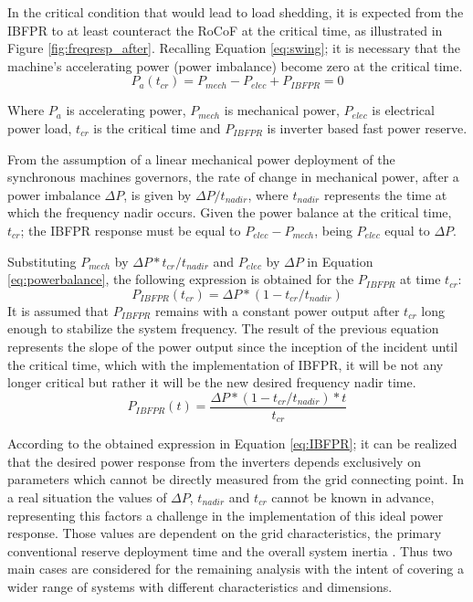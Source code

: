 In the critical condition that would lead to load shedding, it is expected from the IBFPR to at least counteract the RoCoF at the critical time, as illustrated in Figure \ref{fig:freqresp_after}.
Recalling Equation \eqref{eq:swing}; it is necessary that the machine’s accelerating power (power imbalance) become zero at the critical time.
\begin{equation}
	\label{eq:powerbalance}
	P_a (t_{cr} )=P_{mech}-P_{elec}+P_{IBFPR}=0
\end{equation}

Where $ P_a $ is accelerating power, $ P_{mech} $ is mechanical power, $ P_{elec} $ is electrical power load, $ t_{cr} $ is the critical time and $ P_{IBFPR} $ is inverter based fast power reserve.

From the assumption of a linear mechanical power deployment of the synchronous machines governors, the rate of change in mechanical power, after a power imbalance $ \Delta P $, is given by $ \Delta P/t_{nadir} $, where $ t_{nadir} $ represents the time at which the frequency nadir occurs. Given the power balance at the critical time, $ t_{cr} $; the IBFPR response must be equal to $ P_{elec}-P_{mech} $, being $ P_{elec} $ equal to $ \Delta P $.


Substituting $ P_{mech} $ by $ \Delta P* t_{cr} /t_{nadir} $ and $ P_{elec} $ by $ \Delta P $ in Equation \eqref{eq:powerbalance}, the following expression is obtained for the $ P_{IBFPR} $ at time $ t_{cr} $:
\begin{equation}
	\label{eq:p_at_tcr}
	P_{IBFPR} (t_{cr} )=\Delta P*(1-t_{cr}/t_{nadir} )
\end{equation}
It is assumed that $ P_{IBFPR} $ remains with a constant power output after $ t_{cr} $ long enough to stabilize the system frequency. The result of the previous equation represents the slope of the power output since the inception of the incident until the critical time, which with the implementation of IBFPR, it will be not any longer critical but rather it will be the new desired frequency nadir time.
\begin{equation}
	\label{eq:IBFPR}
	P_{IBFPR} (t)=\dfrac{\Delta P*(1-t_{cr}/t_{nadir} )*t}{t_{cr}}
\end{equation}

According to the obtained expression in Equation \eqref{eq:IBFPR}; it can be realized that the desired power response from the inverters depends exclusively on parameters which cannot be directly measured from the grid connecting point. In a real situation the values of $\Delta P$, $ t_{nadir} $ and $ t_{cr} $ cannot be known in advance, representing this factors a challenge in the implementation of this ideal power response. Those values are dependent on the grid characteristics, the primary conventional reserve deployment time and the overall system inertia \cite{orum2015future}. Thus two main cases are considered for the remaining analysis with the intent of covering a wider range of systems with different characteristics and dimensions.

